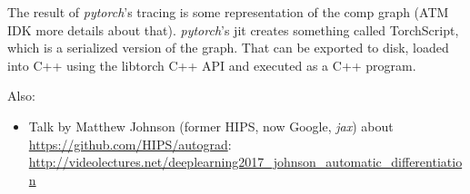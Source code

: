 \documentclass[parskip,paper=a4,11pt,headsepline]{scrartcl}
\newcommand{\soft}[1]{\textsl{#1}\xspace}
\newcommand{\pytorch}{\soft{pytorch}}
\newcommand{\jax}{\soft{jax}}
\begin{document}
The result of \pytorch's tracing is some representation of the comp graph (ATM
IDK more details about that). \pytorch's jit creates something called
TorchScript, which is a serialized version of the graph. That can be exported
to disk, loaded into C++ using the libtorch C++ API and executed as a C++
program.





Also:

\begin{itemize}
    \item Talk by Matthew Johnson (former HIPS, now Google, \jax) about
        \url{https://github.com/HIPS/autograd}:
        \url{http://videolectures.net/deeplearning2017_johnson_automatic_differentiation}
\end{itemize}
\end{document}
